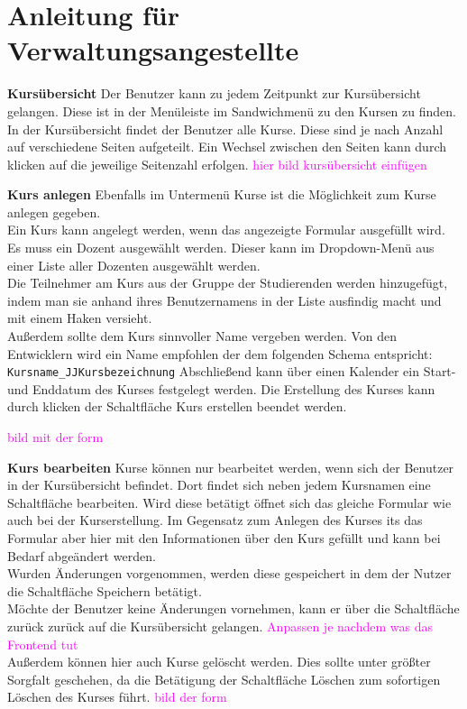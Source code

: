 
\chapter{Anleitung für Verwaltungsangestellte}
\label{sec:chap1}
\textbf{Kursübersicht}
Der Benutzer kann zu jedem Zeitpunkt zur Kursübersicht gelangen. Diese ist in der Menüleiste im Sandwichmenü zu den Kursen zu finden.\\
In der Kursübersicht findet der Benutzer alle Kurse. Diese sind je nach Anzahl auf verschiedene Seiten aufgeteilt. Ein Wechsel zwischen den Seiten kann durch klicken auf die jeweilige Seitenzahl erfolgen. 
\textcolor{magenta}{hier bild kursübersicht einfügen}

\textbf{Kurs anlegen}
Ebenfalls im Untermenü Kurse ist die Möglichkeit zum Kurse anlegen gegeben.\\
Ein Kurs kann angelegt werden, wenn das angezeigte Formular ausgefüllt wird. Es muss ein Dozent ausgewählt werden. Dieser kann im Dropdown-Menü aus einer Liste aller Dozenten ausgewählt werden. \\
Die Teilnehmer am Kurs aus der Gruppe der Studierenden werden hinzugefügt, indem man sie anhand ihres Benutzernamens in der Liste ausfindig macht und mit einem Haken versieht. \\
Außerdem sollte dem Kurs sinnvoller Name vergeben werden. Von den Entwicklern wird ein Name empfohlen der dem folgenden Schema entspricht: \\
\verb/Kursname_JJKursbezeichnung/
Abschließend kann über einen Kalender ein Start- und Enddatum des Kurses festgelegt werden. 
Die Erstellung des Kurses kann durch klicken der Schaltfläche \glqq Kurs erstellen\grqq\: beendet werden.

\textcolor{magenta}{bild mit der form}

\textbf{Kurs bearbeiten}
Kurse können nur bearbeitet werden, wenn sich der Benutzer in der Kursübersicht befindet. Dort findet sich neben jedem Kursnamen eine Schaltfläche \glqq bearbeiten\grqq . Wird diese betätigt öffnet sich das gleiche Formular wie auch bei der Kurserstellung. Im Gegensatz zum Anlegen des Kurses its das Formular aber hier mit den Informationen über den Kurs gefüllt und kann bei Bedarf abgeändert werden.\\
Wurden Änderungen vorgenommen, werden diese gespeichert in dem der Nutzer die Schaltfläche \glqq Speichern\grqq\: betätigt.\\
Möchte der Benutzer keine Änderungen vornehmen, kann er über die Schaltfläche \glqq zurück\grqq\: zurück auf die Kursübersicht gelangen. \textcolor{magenta}{Anpassen je nachdem was das Frontend tut}\\
Außerdem können hier auch Kurse gelöscht werden. Dies sollte unter größter Sorgfalt geschehen, da die Betätigung der Schaltfläche \glqq Löschen\grqq\: zum sofortigen Löschen des Kurses führt.
\textcolor{magenta}{bild der form}

